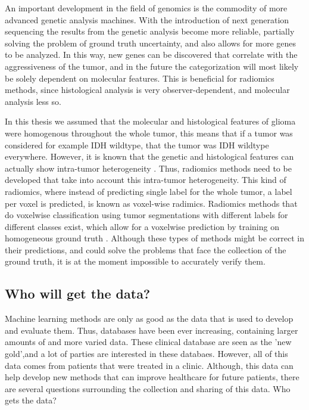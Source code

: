 An important development in the field of genomics is the commodity of more advanced genetic analysis machines.
With the introduction of next generation sequencing the results from the genetic analysis become more reliable, partially solving the problem of ground truth uncertainty, and also allows for more genes to be analyzed.
In this way, new genes can be discovered that correlate with the aggressiveness of the tumor, and in the future the categorization will most likely be solely dependent on molecular features.
This is beneficial for radiomics methods, since histological analysis is very observer-dependent, and molecular analysis less so.

In this thesis we assumed that the molecular and histological features of glioma were homogenous throughout the whole \gls{tumor}, this means that if a \gls{tumor} was considered for example \gls{IDH} wildtype, that the \gls{tumor} was \gls{IDH} wildtype everywhere.
However, it is known that the genetic and histological features can actually show intra-tumor heterogeneity \autocite{eder2014heterogeneity}.
Thus, radiomics methods need to be developed that take into account this intra-tumor heterogeneity.
This kind of radiomics, where instead of predicting single label for the whole \gls{tumor}, a label per voxel is predicted, is known as voxel-wise radimics.
Radiomics methods that do voxelwise classification using \gls{tumor} segmentations with different labels for different classes exist, which allow for a voxelwise prediction by training on homogeneous ground truth \autocite{yogananda20201p19q}.
Although these types of methods might be correct in their predictions, and could solve the problems that face the collection of the ground truth, it is at the moment impossible to accurately verify them.




\subsection{Who will get the data?}

Machine learning methods are only as good as the data that is used to develop and evaluate them.
Thus, databases have been ever increasing, containing larger amounts of and more varied data.
These clinical database are seen as the 'new gold',and a lot of parties are interested in these databaes.
However, all of this data comes from patients that were treated in a clinic.
Although, this data can help develop new methods that can improve healthcare for future patients, there are several questions surrounding the collection and sharing of this data.
Who gets the data?


